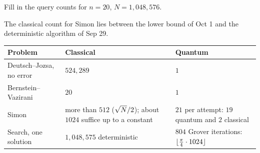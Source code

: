 \begin{exercisebox}
\begin{pproblem}[The numbers for $n = 20$]\label{pp:n20}
    Fill in the query counts for $n = 20$, $N = 1{,}048{,}576$.
\end{pproblem}
\tcblower
\begin{wsolution}
    The classical count for Simon lies between the lower bound of Oct 1 and the deterministic
    algorithm of Sep 29.
    \begin{center}
        \begin{tabular}{lp{4.4cm}p{4.4cm}}
            \toprule
            Problem                   & Classical                                                                         & Quantum                                                         \\ \midrule
            Deutsch--Jozsa, no error  & $524{,}289$                                                                       & $1$                                                             \\
            Bernstein--Vazirani       & $20$                                                                              & $1$                                                             \\
            Simon                     & more than $512$ ($\sqrt{N}/2$); about $1024$ suffice up to a constant    & $21$ per attempt: $19$ quantum and $2$ classical                \\
            Search, one solution      & $1{,}048{,}575$ deterministic                                                     & $804$ Grover iterations: $\floor{\frac{\pi}{4} \cdot 1024}$     \\ \bottomrule
        \end{tabular}
    \end{center}
\end{wsolution}
\end{exercisebox}

